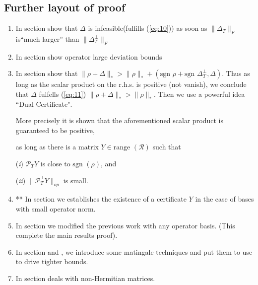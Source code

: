 \documentclass{article}
\begin{document}
\subsection{Further layout of proof}
\begin{enumerate}
\item In section \uppercase\expandafter{} show that $\Delta$ is infeasible(fulfills (\ref{eq:10})) as soon as $\|\Delta_T\|_F$ is``much larger'' than $\|\Delta_T^\perp\|_F$

\item In section \uppercase\expandafter{} show operator large deviation bounds

\item In section \uppercase\expandafter{} show that $\|\rho + \Delta\|_* > \|\rho\|_* +(\text{sgn }\rho+\text{sgn }\Delta_T^\perp, \Delta)$. Thus as long as the scalar product on the r.h.s. 	is positive (not vanish), we conclude that $\Delta$ fulfells (\ref{eq:11}) $\|\rho+\Delta\|_* > \|\rho\|_*$. Then we use a powerful idea ``Dual Certificate".  

More precisely it is shown that the aforementioned scalar product is guaranteed to be positive, {\color{red}as long as there is a matrix $Y \in \text{range }(\mathcal{R})$ such that 

(\textit{i}) $\mathcal{P}_T Y$ is close to $\text{sgn } (\rho)$, and

(\textit{ii}) $\| \mathcal{P}_T^\perp Y\|_{op}$ is small. }

\item ** In section \uppercase\expandafter{} we establishes the existence of a certificate $Y$ in the case of bases with {\color{red}small operator norm}. 

\item In section \uppercase\expandafter{} we modified the previous work with any operator basis. (This complete the main results proof).

\item In section \uppercase\expandafter{} and \uppercase\expandafter{}, we introduce some matingale techniques and put them to use to drive tighter bounds.

\item In section \uppercase\expandafter{} deals with non-Hermitian matrices.
\end{enumerate}
\end{document}
